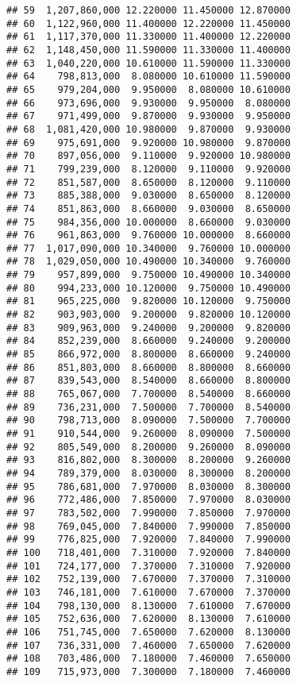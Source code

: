 \documentclass[]{article}
\begin{document}
\begin{verbatim}
## 59  1,207,860,000 12.220000 11.450000 12.870000
## 60  1,122,960,000 11.400000 12.220000 11.450000
## 61  1,117,370,000 11.330000 11.400000 12.220000
## 62  1,148,450,000 11.590000 11.330000 11.400000
## 63  1,040,220,000 10.610000 11.590000 11.330000
## 64    798,813,000  8.080000 10.610000 11.590000
## 65    979,204,000  9.950000  8.080000 10.610000
## 66    973,696,000  9.930000  9.950000  8.080000
## 67    971,499,000  9.870000  9.930000  9.950000
## 68  1,081,420,000 10.980000  9.870000  9.930000
## 69    975,691,000  9.920000 10.980000  9.870000
## 70    897,056,000  9.110000  9.920000 10.980000
## 71    799,239,000  8.120000  9.110000  9.920000
## 72    851,587,000  8.650000  8.120000  9.110000
## 73    885,388,000  9.030000  8.650000  8.120000
## 74    851,863,000  8.660000  9.030000  8.650000
## 75    984,356,000 10.000000  8.660000  9.030000
## 76    961,863,000  9.760000 10.000000  8.660000
## 77  1,017,090,000 10.340000  9.760000 10.000000
## 78  1,029,050,000 10.490000 10.340000  9.760000
## 79    957,899,000  9.750000 10.490000 10.340000
## 80    994,233,000 10.120000  9.750000 10.490000
## 81    965,225,000  9.820000 10.120000  9.750000
## 82    903,903,000  9.200000  9.820000 10.120000
## 83    909,963,000  9.240000  9.200000  9.820000
## 84    852,239,000  8.660000  9.240000  9.200000
## 85    866,972,000  8.800000  8.660000  9.240000
## 86    851,803,000  8.660000  8.800000  8.660000
## 87    839,543,000  8.540000  8.660000  8.800000
## 88    765,067,000  7.700000  8.540000  8.660000
## 89    736,231,000  7.500000  7.700000  8.540000
## 90    798,713,000  8.090000  7.500000  7.700000
## 91    910,544,000  9.260000  8.090000  7.500000
## 92    805,549,000  8.200000  9.260000  8.090000
## 93    816,802,000  8.300000  8.200000  9.260000
## 94    789,379,000  8.030000  8.300000  8.200000
## 95    786,681,000  7.970000  8.030000  8.300000
## 96    772,486,000  7.850000  7.970000  8.030000
## 97    783,502,000  7.990000  7.850000  7.970000
## 98    769,045,000  7.840000  7.990000  7.850000
## 99    776,825,000  7.920000  7.840000  7.990000
## 100   718,401,000  7.310000  7.920000  7.840000
## 101   724,177,000  7.370000  7.310000  7.920000
## 102   752,139,000  7.670000  7.370000  7.310000
## 103   746,181,000  7.610000  7.670000  7.370000
## 104   798,130,000  8.130000  7.610000  7.670000
## 105   752,636,000  7.620000  8.130000  7.610000
## 106   751,745,000  7.650000  7.620000  8.130000
## 107   736,331,000  7.460000  7.650000  7.620000
## 108   703,486,000  7.180000  7.460000  7.650000
## 109   715,973,000  7.300000  7.180000  7.460000

\end{verbatim}
\end{document}
